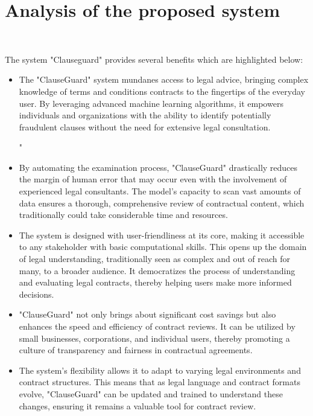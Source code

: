 \chapter{Analysis of the proposed system \\
\label{Chapter::Analysis of the proposed system}}\

The system "Clauseguard" provides several benefits which are highlighted below: 
\begin{itemize}
    \item The "ClauseGuard" system mundanes access to legal advice, bringing complex knowledge of terms and conditions contracts to the fingertips of the everyday user. By leveraging advanced machine learning algorithms, it empowers individuals and organizations with the ability to identify potentially fraudulent clauses without the need for extensive legal consultation.

" 
    \item By automating the examination process, "ClauseGuard" drastically reduces the margin of human error that may occur even with the involvement of experienced legal consultants. The model's capacity to scan vast amounts of data ensures a thorough, comprehensive review of contractual content, which traditionally could take considerable time and resources.
    \item The system is designed with user-friendliness at its core, making it accessible to any stakeholder with basic computational skills. This opens up the domain of legal understanding, traditionally seen as complex and out of reach for many, to a broader audience. It democratizes the process of understanding and evaluating legal contracts, thereby helping users make more informed decisions.
    \item "ClauseGuard" not only brings about significant cost savings but also enhances the speed and efficiency of contract reviews. It can be utilized by small businesses, corporations, and individual users, thereby promoting a culture of transparency and fairness in contractual agreements.
    \item The system's flexibility allows it to adapt to varying legal environments and contract structures. This means that as legal language and contract formats evolve, "ClauseGuard" can be updated and trained to understand these changes, ensuring it remains a valuable tool for contract review.


\end{itemize}
